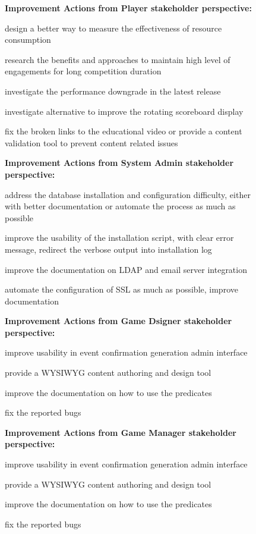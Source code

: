 \begin{figure}[ht!]
\begin{mybox}

\textbf{Improvement Actions from Player stakeholder perspective:}
\begin{compactenum}
\item design a better way to measure the effectiveness of resource consumption 
\item research the benefits and approaches to maintain high level of engagements for long competition duration
\item investigate the performance downgrade in the latest release
\item investigate alternative to improve the rotating scoreboard display
\item fix the broken links to the educational video or provide a content validation tool to prevent content related issues
\end{compactenum}

\textbf{Improvement Actions from System Admin stakeholder perspective:}
\begin{compactenum}
\item address the database installation and configuration difficulty, either with better documentation or automate the process as much as possible
\item improve the usability of the installation script, with clear error message, redirect the verbose output into installation log
\item improve the documentation on LDAP and email server integration
\item automate the configuration of SSL as much as possible, improve documentation
\end{compactenum}

\textbf{Improvement Actions from Game Dsigner stakeholder perspective:}
\begin{compactenum}
\item improve usability in event confirmation generation admin interface
\item provide a WYSIWYG content authoring and design tool
\item improve the documentation on how to use the predicates
\item fix the reported bugs 
\end{compactenum}

\textbf{Improvement Actions from Game Manager stakeholder perspective:}
\begin{compactenum}
\item improve usability in event confirmation generation admin interface
\item provide a WYSIWYG content authoring and design tool
\item improve the documentation on how to use the predicates
\item fix the reported bugs 
\end{compactenum}


\end{mybox}
\end{figure}

